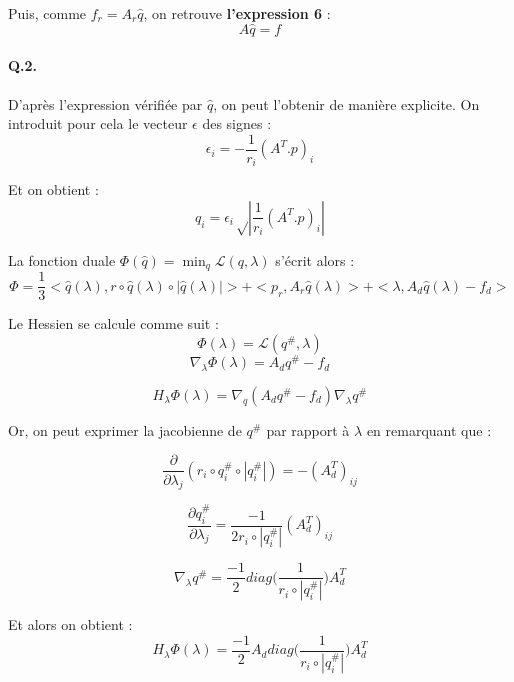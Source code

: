 \documentclass{article}
\begin{document}
        Puis, comme $f_r = A_r \hat{q}$, on retrouve \textbf{l'expression 6} :
        \[ A \hat{q} = f \]

        \paragraph{Q.2.} D'après l'expression vérifiée par $\hat{q}$, on peut l'obtenir de manière explicite.
        On introduit pour cela le vecteur $\epsilon$ des signes :
        \[\epsilon_i = -\frac{1}{r_i}(A^T.p)_i\]

        Et on obtient : 
        \[ \boxed{q_i = \epsilon_i \sqrt\left| \frac{1}{r_i}\left(A^T.p\right)_i\right|}\]

        La fonction duale $\Phi(\hat{q}) = \min_q \mathcal{L}(q, \lambda)$ s'écrit alors :
        \[\boxed{\Phi = \frac{1}{3}<\hat{q}(\lambda), r \circ \hat{q}(\lambda) \circ |\hat{q}(\lambda)|> + <p_r, A_r\hat{q}(\lambda)>
        + <\lambda, A_d\hat{q}(\lambda) - f_d>}\]
        
        Le Hessien se calcule comme suit :
        $$ \Phi (\lambda) = \mathcal{L} (q^{\#}, \lambda) $$
        $$ \nabla_{\lambda} \Phi (\lambda) = A_d q^{\#} - f_d $$

        $$ H_{\lambda} \Phi (\lambda) = \nabla_q (A_d q^{\#} - f_d) \nabla_{\lambda} q^{\#} $$

        Or, on peut exprimer la jacobienne de $q^{\#}$ par rapport à $\lambda$ en remarquant que :

        $$ \frac{\partial}{\partial \lambda_j} (r_i\circ q_i^{\#}\circ |q_i^{\#}|) = - (A_d^T)_{ij} $$
        
        $$ \frac{\partial q_i^{\#}}{\partial \lambda_j} = \frac{-1}{2r_i\circ |q_i^{\#}|} (A_d^T)_{ij} $$

        $$ \nabla_{\lambda} q^{\#} = \frac{-1}{2} diag\big(\frac{1}{r_i\circ |q_i^{\#}|}\big) A_d^T $$


        Et alors on obtient :
        $$\boxed{H_{\lambda} \Phi (\lambda) = \frac{-1}{2} A_d diag\big(\frac{1}{r_i\circ|q_i^{\#}|}\big) A_d^T} $$
\end{document}
